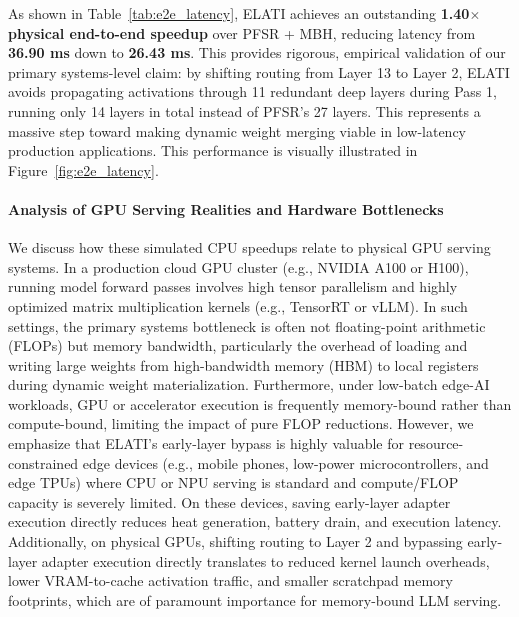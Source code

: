 As shown in Table~\ref{tab:e2e_latency}, ELATI achieves an outstanding \textbf{1.40$\times$ physical end-to-end speedup} over PFSR + MBH, reducing latency from \textbf{36.90 ms} down to \textbf{26.43 ms}.
This provides rigorous, empirical validation of our primary systems-level claim: by shifting routing from Layer 13 to Layer 2, ELATI avoids propagating activations through 11 redundant deep layers during Pass 1, running only 14 layers in total instead of PFSR's 27 layers.
This represents a massive step toward making dynamic weight merging viable in low-latency production applications.
This performance is visually illustrated in Figure~\ref{fig:e2e_latency}.

\paragraph{Analysis of GPU Serving Realities and Hardware Bottlenecks}
We discuss how these simulated CPU speedups relate to physical GPU serving systems. In a production cloud GPU cluster (e.g., NVIDIA A100 or H100), running model forward passes involves high tensor parallelism and highly optimized matrix multiplication kernels (e.g., TensorRT or vLLM). In such settings, the primary systems bottleneck is often not floating-point arithmetic (FLOPs) but memory bandwidth, particularly the overhead of loading and writing large weights from high-bandwidth memory (HBM) to local registers during dynamic weight materialization. Furthermore, under low-batch edge-AI workloads, GPU or accelerator execution is frequently memory-bound rather than compute-bound, limiting the impact of pure FLOP reductions. However, we emphasize that ELATI's early-layer bypass is highly valuable for resource-constrained edge devices (e.g., mobile phones, low-power microcontrollers, and edge TPUs) where CPU or NPU serving is standard and compute/FLOP capacity is severely limited. On these devices, saving early-layer adapter execution directly reduces heat generation, battery drain, and execution latency. Additionally, on physical GPUs, shifting routing to Layer 2 and bypassing early-layer adapter execution directly translates to reduced kernel launch overheads, lower VRAM-to-cache activation traffic, and smaller scratchpad memory footprints, which are of paramount importance for memory-bound LLM serving.

